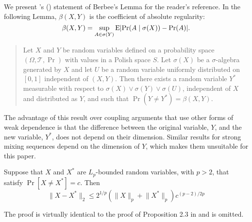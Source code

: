 \documentclass[12pt]{article}
\begin{document}
We present \citeauthor{MeP:02}'s
(\citeyear{MeP:02}) statement of Berbee's Lemma for
the reader's reference.  In the following Lemma, $\beta(X,Y)$ is the
coefficient of absolute regularity:
\[
\beta(X,Y) = \sup_{A \in \sigma(Y)} \operatorname{E} \lvert \Pr(A \mid \sigma(X))
  - \Pr(A) \rvert.
\]
\begin{lem}\label{lem-berbee}\quad

\begin{quotation}\noindent
  Let $X$ and $Y$ be random variables defined on a probability space
  $(\Omega, \mathcal{T}, \Pr)$ with values in a Polish space
  $S$.  Let $\sigma(X)$ be a $\sigma$-algebra generated by $X$ and let
  $U$ be a random variable uniformly distributed on $[0,1]$
  independent of $(X,Y)$.  Then there exists a random variable $Y^{*}$
  measurable with respect to $\sigma(X) \vee \sigma(Y) \vee
  \sigma(U)$, independent of $X$ and distributed as $Y$, and such that
  $\Pr(Y \neq Y^{*}) = \beta(X,Y)$.

  \noindent\citep{MeP:02}
\end{quotation}
\end{lem}

The advantage of this result over coupling arguments that use other
forms of weak dependence is that the difference between the original
variable, $Y$, and the new variable, $Y^{*}$, does not depend on their
dimension.  Similar results for strong mixing sequences depend on the
dimension of $Y$, which makes them unsuitable for this paper.

\begin{lem}\label{lem-extend-mp}
  Suppose that $X$ and $X^*$ are $L_p$-bounded random variables, with
  $p > 2$, that satisfy ${\Pr[X \neq X^*] = c}$.  Then
  \[
    \lVert X - X^* \rVert_2 \leq 2^{1/p} (\lVert X \rVert_p + \lVert
    X^* \rVert_p) c^{(p-2)/2p}
  \]
\end{lem}

The proof is virtually identical to the proof of Proposition 2.3 in
\citet{MeP:02} and is omitted.
\end{document}
